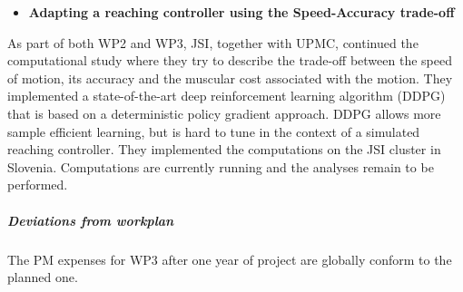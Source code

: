 \begin{itemize}
\item \textbf{Adapting a reaching controller using the Speed-Accuracy trade-off}
\end{itemize}
As part of both WP2 and WP3, JSI, together with UPMC, continued the computational study where they try to describe the trade-off between the speed of motion, its accuracy and the muscular cost associated with the motion. They implemented a state-of-the-art deep reinforcement learning algorithm (DDPG) that is based on a deterministic policy gradient approach. DDPG allows more sample efficient learning, but is hard to tune in the context of a simulated reaching controller. They implemented the computations on the JSI cluster in Slovenia. Computations are currently running and the analyses remain to be performed.
    
\subparagraph{Deviations from workplan}  

The PM expenses for WP3 after one year of project are globally conform to the planned one.





